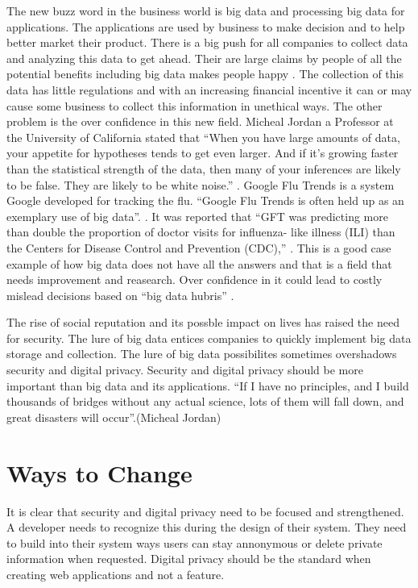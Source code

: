 \documentclass[12pt]{article}
\begin{document}
The new buzz word in the business world is big data and processing big data for applications. The applications are used by business to make decision and to help better market their product. There is a big push for all companies to collect data and analyzing this data to get ahead. Their are large claims by people of all the potential benefits including big data makes people happy \cite{Banayan}. The collection of this data has little regulations and with an increasing financial incentive it can or may cause some business to collect this information in unethical ways. The other problem is the over confidence in this new field. Micheal Jordan a Professor at the University of California stated that ``When you have large amounts of data, your appetite for hypotheses tends to get even larger. And if it’s growing faster than the statistical strength of the data, then many of your inferences are likely to be false. They are likely to be white noise.'' \cite{Gomes}. Google Flu Trends is a system Google developed for tracking the flu. ``Google Flu Trends is often held up as an exemplary use of big data''. \cite{Lazer}. It was reported that ``GFT was predicting more than double the proportion of doctor visits for influenza- like illness (ILI) than the Centers for Disease Control and Prevention (CDC),'' \cite{Lazer}. This is a good case example of how big data does not have all the answers and that is a field that needs improvement and reasearch. Over confidence in it could lead to costly mislead decisions based on ``big data hubris'' \cite{Lazer}.

The rise of social reputation and its possble impact on lives has raised the need for security. The lure of big data entices companies to quickly implement big data storage and collection. The lure of big data possibilites sometimes overshadows security and digital privacy. Security and digital privacy should be more important than big data and its applications. ``If I have no principles, and I build thousands of bridges without any actual science, lots of them will fall down, and great disasters will occur''.(Micheal Jordan)\cite{Gomes}

\section{Ways to  Change}\label{sec:developers}
It is clear that security and digital privacy need to be focused and strengthened. A developer needs to recognize this during the design of their system. They need to build into their system ways users can stay annonymous or delete private information when requested. Digital privacy should be the standard when creating web applications and not a feature.
\end{document}
